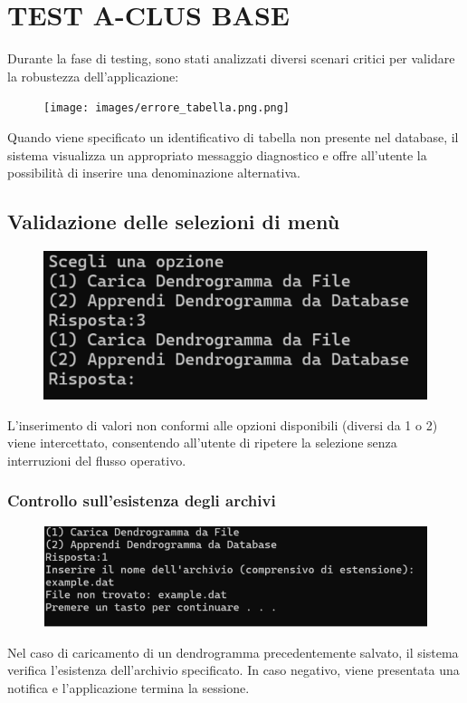 \section{TEST A-CLUS BASE}

Durante la fase di testing, sono stati analizzati diversi scenari critici per validare la robustezza dell'applicazione:


\begin{figure}[h!]
    \centering
    \texttt{[image: images/errore\_tabella.png.png]}
\end{figure}

Quando viene specificato un identificativo di tabella non presente nel database, il sistema visualizza un appropriato messaggio diagnostico e offre all'utente la possibilità di inserire una denominazione alternativa.


\subsection{Validazione delle selezioni di menù}

\begin{figure}[h!]
    \centering
    \includegraphics[width=\textwidth]{images/errore_men.png}
\end{figure}

L'inserimento di valori non conformi alle opzioni disponibili (diversi da 1 o 2) viene intercettato, consentendo all'utente di ripetere la selezione senza interruzioni del flusso operativo.

\subsubsection{Controllo sull'esistenza degli archivi} 
\begin{figure}[h!]
    \centering
    \includegraphics[width=\textwidth]{images/controllo_archivi.png}
\end{figure}
Nel caso di caricamento di un dendrogramma precedentemente salvato, il sistema verifica l'esistenza dell'archivio specificato. In caso negativo, viene presentata una notifica e l'applicazione termina la sessione.

